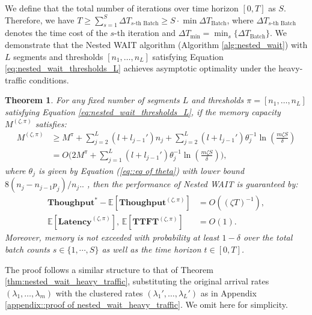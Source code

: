 \documentclass[preprint]{article}
\newcommand{\throughput}{\textbf{Thoughput}}
\newcommand{\Latency}{\textbf{Latency}}
\newcommand{\TTFT}{\textbf{TTFT}}
\theoremstyle{plain}
\newtheorem{theorem}{Theorem}[section]
\theoremstyle{definition}
\theoremstyle{remark}
\begin{document}
 We define that the total number of iterations over time horizon $[0,T]$ as $ S$. Therefore, we have $T\ge\sum_{s=1}^S \Delta T_{s\text{-th Batch}}\geq S\cdot \min \Delta T_{\text{Batch}}$, where $ \Delta T_{s\text{-th Batch}}$ denotes the time cost of the $s$-th iteration and $\Delta T_{\min}=\min_s\{\Delta T_{\text{Batch}}\}$. We demonstrate that the Nested WAIT algorithm (Algorithm \ref{alg:nested_wait}) with $L$ segments and thresholds $[n_1, \dots, n_L]$ satisfying Equation \eqref{eq:nested_wait_thresholds_L} achieves asymptotic optimality under the heavy-traffic conditions.
\begin{theorem}
\label{thm:nested_wait_heavy_traffic, any segment}
For any fixed number of segments $L$ and thresholds $\pi = [n_1, \dots, n_L]$ satisfying Equation \eqref{eq:nested_wait_thresholds_L}, if the memory capacity $M^{(\zeta, \pi)}$ satisfies:
\begin{equation}
    \label{eq:nested_wait_memory_L}
    \begin{aligned}
M^{(\zeta, \pi)} 
&\geq M^\pi 
+ \sum_{j=2}^L (l + l_{j-1}') n_j 
+ \sum_{j=2}^L (l + l_{j-1}') \theta_j^{-1} 
\ln\left( \frac{m \zeta S}{\delta} \right) \\
&= O\biggl( 2M^\pi 
+ \sum_{j=1}^L (l + l_{j-1}') \theta_j^{-1}
\ln\left( \frac{m \zeta S}{\delta} \right) \biggr),
    \end{aligned}
\end{equation}
where $\theta_j$ is given by Equation (\ref{eq::eq of theta}) with lower bound $8(n_j-n_{j-1}p_j)/n_j..$
, then the performance of Nested WAIT is guaranteed by:
\[ 
    \begin{aligned}
        \throughput^* 
- \mathbb{E}\left[ \throughput^{(\zeta, \pi)} \right] 
&= O\left( (\zeta T)^{-1} \right), \\
\mathbb{E}\left[ \Latency^{(\zeta, \pi)} \right] ,\,\mathbb{E}\left[ \TTFT^{(\zeta, \pi)} \right] 
&= O(1).
    \end{aligned}
\]
Moreover, memory is not exceeded with probability at least \( 1 - \delta \) over the total batch counts $s\in \{1,\cdots,S\}$ as well as the time horizon $t \in [0, T]$.
\end{theorem}

The proof follows a similar structure to that of Theorem \ref{thm:nested_wait_heavy_traffic}, substituting the original arrival rates $(\lambda_1, \dots, \lambda_m)$ with the clustered rates $(\lambda_1', \dots, \lambda_L')$ as in Appendix \ref{appendix::proof of nested_wait_heavy_traffic}. We omit here for simplicity.
\end{document}

